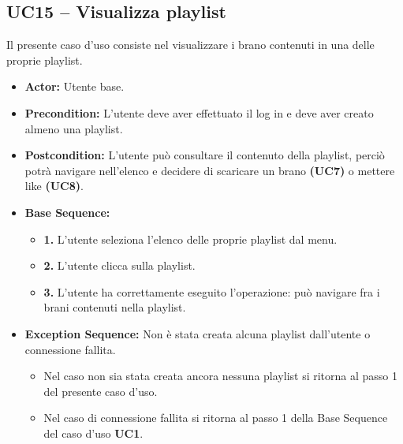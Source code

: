 \subsection{UC15 -- Visualizza playlist}
Il presente caso d'uso consiste nel visualizzare i brano contenuti in una delle proprie playlist. 
\begin{itemize}
    \item \textbf{Actor:} Utente base.
    \item \textbf{Precondition:} L'utente deve aver effettuato il log in e deve aver creato almeno una playlist.
    \item \textbf{Postcondition:} L'utente può consultare il contenuto della playlist, 
    perciò potrà navigare nell'elenco 
    e decidere di scaricare un brano \textbf{(UC7)} o mettere like \textbf{(UC8)}.
    \item \textbf{Base Sequence:}
    \begin{itemize}
        \item \textbf{1.} L'utente seleziona l'elenco delle proprie playlist dal menu.
        \item \textbf{2.} L'utente clicca sulla playlist.
        \item \textbf{3.} L'utente ha correttamente eseguito l'operazione: può navigare fra i brani contenuti nella playlist.
    \end{itemize}
    \item \textbf{Exception Sequence:} Non è stata creata alcuna playlist dall'utente o connessione fallita.
    \begin{itemize}
        \item Nel caso non sia stata creata ancora nessuna playlist si ritorna al passo 1 del presente caso d'uso.
        \item Nel caso di connessione fallita si ritorna al passo 1 della Base Sequence del caso d'uso \textbf{UC1}.
    \end{itemize}
\end{itemize}
\vspace{1cm}

